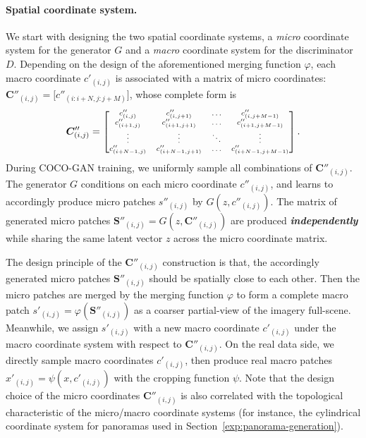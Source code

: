\documentclass{article}
\newcommand{\modelName}{COCO-GAN }
\begin{document}
    \paragraph{Spatial coordinate system.} 
We start with designing the two spatial coordinate systems, a \emph{micro} coordinate system for the generator $G$ and a \emph{macro} coordinate system for the discriminator $D$. Depending on the design of the aforementioned merging function $\varphi$, each macro coordinate $c'_{(i,j)}$ is associated with a matrix of micro coordinates: ${\bm{C}''}_{(i,j)} = \big[ c''_{(i:i+N,j:j+M)} \big]$, whose complete form is
    $$ \scriptsize 
    \bm{C}''_{(i,j)} =
    \begin{bmatrix}
        c''_{(i,j)}     & c''_{(i,j+1)}     & \dots  & c''_{(i,j+M-1)} \\
        c''_{(i+1,j)}   & c''_{(i+1,j+1)}   & \dots  & c''_{(i+1,j+M-1)} \\
        \vdots          & \vdots            & \ddots & \vdots \\
        c''_{(i+N-1,j)} & c''_{(i+N-1,j+1)} & \dots  & c''_{(i+N-1,j+M-1)}
    \end{bmatrix}.
$$
    During \modelName training, we uniformly sample all combinations of $\bm{C}''_{(i,j)}$. The generator $G$ conditions on each micro coordinate $c''_{(i,j)}$, and learns to accordingly produce micro patches $s''_{(i,j)}$ by $G(z,c''_{(i,j)})$. The matrix of generated micro patches
    $\bm{S}''_{(i,j)} = G(z,\bm{C}''_{(i,j)})$ are produced \emph{\textbf{independently}} while sharing the same latent vector $z$ across the micro coordinate matrix.
    
    The design principle of the $\bm{C}''_{(i,j)}$ construction is that, the accordingly generated micro patches $\bm{S}''_{(i,j)}$ should be spatially close to each other. Then the micro patches are merged by the merging function $\varphi$ to form a complete macro patch $s'_{(i,j)} = \varphi(\bm{S}''_{(i,j)})$ as a coarser partial-view of the imagery full-scene. Meanwhile, we assign $s'_{(i,j)}$ with a new macro coordinate $c'_{(i,j)}$ under the macro coordinate system with respect to $\bm{C}''_{(i,j)}$. On the real data side, we directly sample macro coordinates $c'_{(i,j)}$, then produce real macro patches $x'_{(i,j)} = \psi(x,c'_{(i,j)})$ with the cropping function $\psi$. Note that the design choice of the micro coordinates $\bm{C}''_{(i,j)}$ is also correlated with the topological characteristic of the micro/macro coordinate systems (for instance, the cylindrical coordinate system for panoramas used in Section~\ref{exp:panorama-generation}).
    
\end{document}
